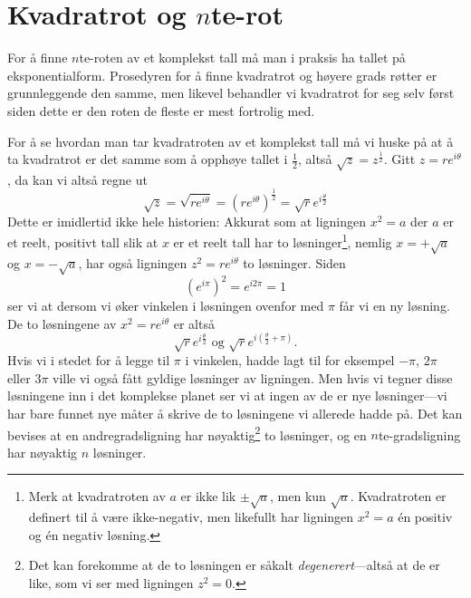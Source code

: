 \documentclass[a4paper,norsk,12pt]{article}
\begin{document}
\section{Kvadratrot og $n$te-rot}
For å finne $n$te-roten av et komplekst tall må man i praksis ha tallet på eksponentialform. Prosedyren for å finne kvadratrot og høyere grads røtter er grunnleggende den samme, men likevel behandler vi kvadratrot for seg selv først siden dette er den roten de fleste er mest fortrolig med. 

For å se hvordan man tar kvadratroten av et komplekst tall må vi huske på at å ta kvadratrot er det samme som å opphøye tallet i $\frac12$, altså $\sqrt{z} = z^\frac12$. Gitt $z = re^{i\theta}$, da kan vi altså regne ut
\begin{displaymath}
	\sqrt{z} = \sqrt{re^{i\theta}} = \left(re^{i\theta}\right)^\frac12 = \sqrt{r}e^{i\frac{\theta}{2}}
\end{displaymath}
Dette er imidlertid ikke hele historien: Akkurat som at ligningen $x^2=a$ der $a$ er et reelt, positivt tall slik at $x$ er et reelt tall har to løsninger\footnote{Merk at kvadratroten av $a$ er ikke lik $\pm\sqrt{a}$, men kun $\sqrt{a}$. Kvadratroten er definert til å være ikke-negativ, men likefullt har ligningen $x^2=a$ \'en positiv og \'en negativ løsning.}, nemlig $x=+\sqrt{a}$ og $x =-\sqrt{a}$, har også ligningen $z^2=re^{i\theta}$ to løsninger. Siden 
\begin{displaymath}
	(e^{i\pi})^2 = e^{i2\pi} = 1
\end{displaymath}
ser vi at dersom vi øker vinkelen i løsningen ovenfor med $\pi$ får vi en ny løsning. De to løsningene av $x^2 = re^{i\theta}$ er altså
\begin{displaymath}
	\sqrt{r}e^{i\frac{\theta}{2}} \text{ og } \sqrt{r}e^{i\left(\frac{\theta}{2} + \pi\right)}.
\end{displaymath}
Hvis vi i stedet for å legge til $\pi$ i vinkelen, hadde lagt til for eksempel $-\pi$, $2\pi$ eller $3\pi$ ville vi også fått gyldige løsninger av ligningen. Men hvis vi tegner disse løsningene inn i det komplekse planet ser vi at ingen av de er nye løsninger---vi har bare funnet nye måter å skrive de to løsningene vi allerede hadde på. Det kan bevises at en andregradsligning har nøyaktig\footnote{Det kan forekomme at de to løsningen er såkalt \emph{degenerert}---altså at de er like, som vi ser med ligningen $z^2=0$.} to løsninger, og en $n$te-gradsligning har nøyaktig $n$ løsninger.
\end{document}

